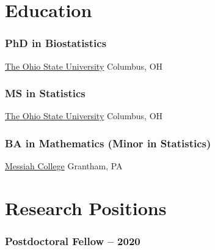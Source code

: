 \documentclass[
  fleqn, oneside]{article}
\author{}
\date{\vspace{-2.5em}}
\begin{document}
\thispagestyle{firststyle}

\renewcommand\labelitemi{}

\hypertarget{education}{%
\section{Education}\label{education}}

\hypertarget{phd-in-biostatistics-2018}{%
\subsubsection{\texorpdfstring{PhD in Biostatistics
\hfill{}}{PhD in Biostatistics 2018}}\label{phd-in-biostatistics-2018}}

\href{https://biostatprograms.osu.edu}{The Ohio State University}
\newline Columbus, OH

\hypertarget{ms-in-statistics-2012}{%
\subsubsection{\texorpdfstring{MS in Statistics
\hfill{}}{MS in Statistics 2012}}\label{ms-in-statistics-2012}}

\href{https://stat.osu.edu}{The Ohio State University} \newline
Columbus, OH

\hypertarget{ba-in-mathematics-minor-in-statistics-2010}{%
\subsubsection{\texorpdfstring{BA in Mathematics (Minor in Statistics)
\hfill{}}{BA in Mathematics (Minor in Statistics) 2010}}\label{ba-in-mathematics-minor-in-statistics-2010}}

\href{https://www.messiah.edu/mathematics-major-pennsylvania}{Messiah
College} \newline Grantham, PA

\hypertarget{research-positions}{%
\section{Research Positions}\label{research-positions}}

\hypertarget{postdoctoral-fellow-2018-2020}{%
\subsubsection{\texorpdfstring{Postdoctoral Fellow
\hfill{} --
2020}{Postdoctoral Fellow 2018 -- 2020}}\label{postdoctoral-fellow-2018-2020}}
\end{document}
